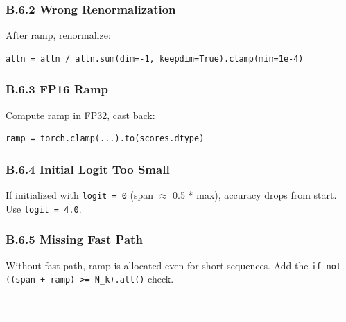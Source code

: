 \subsubsection{B.6.2 Wrong Renormalization}

After ramp, renormalize:
\begin{lstlisting}
attn = attn / attn.sum(dim=-1, keepdim=True).clamp(min=1e-4)
\end{lstlisting}

\subsubsection{B.6.3 FP16 Ramp}

Compute ramp in FP32, cast back:
\begin{lstlisting}
ramp = torch.clamp(...).to(scores.dtype)
\end{lstlisting}

\subsubsection{B.6.4 Initial Logit Too Small}

If initialized with \texttt{logit = 0} (span $\approx$ 0.5 * max), accuracy drops from start. 
Use \texttt{logit = 4.0}.

\subsubsection{B.6.5 Missing Fast Path}

Without fast path, ramp is allocated even for short sequences. Add the 
\texttt{if not ((span + ramp) >= N\_k).all()} check.
\begin{lstlisting}

---
\end{lstlisting}